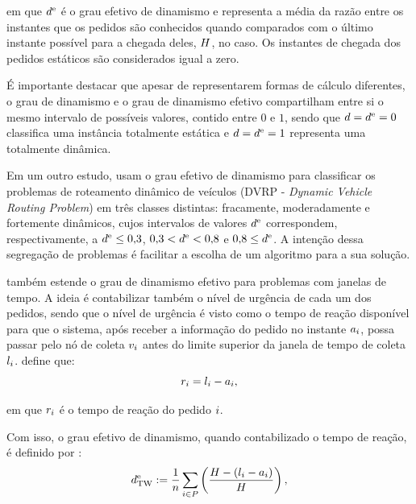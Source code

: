 \noindent em que $d^\text{e}$ é o grau efetivo de dinamismo e 
representa a média da razão entre os instantes que os pedidos são conhecidos 
quando comparados com o último instante possível para a chegada deles, 
$H$, no caso. Os instantes de chegada dos pedidos estáticos são 
considerados igual a zero.

É importante destacar que apesar de representarem formas de cálculo diferentes,
o grau de dinamismo e o grau de dinamismo efetivo compartilham entre si o mesmo
intervalo de possíveis valores, contido entre $0$ e $1$, sendo que
$d = d^\text{e} = 0$ classifica uma instância
totalmente estática e $d = d^\text{e} = 1$ representa
uma totalmente dinâmica.

Em um outro estudo,  usam o grau efetivo
de dinamismo para classificar os problemas de roteamento dinâmico de veículos
(DVRP - \textit{Dynamic Vehicle Routing Problem}) em três classes distintas:
fracamente, moderadamente e fortemente dinâmicos, cujos intervalos de valores 
$d^\text{e}$ correspondem, respectivamente, a $d^\text{e} \leq
0{,}3$, $0{,}3  < d^\text{e} < 0{,}8$ e $0{,}8 \leq
d^\text{e}$.
A intenção dessa segregação de problemas é facilitar a escolha de um algoritmo
para a sua solução.

 também estende o grau de dinamismo efetivo
para problemas com janelas de tempo.
A ideia é contabilizar também o nível de urgência de cada um dos pedidos, 
sendo que o nível de urgência é visto como o tempo de reação disponível
para que o sistema, após receber a informação do pedido no instante
$a_i$, possa passar pelo nó de coleta $v_{i}$
antes do limite superior da janela de tempo de coleta
$l_{i}$.
 define que: 
%
\begin{equation}
  r_i = l_{i}
                           - a_i,
\end{equation}

\noindent em que $r_i$ é o tempo de reação do pedido
$i$.

Com isso, o grau efetivo de dinamismo, quando contabilizado o tempo de reação,
é definido por \cite{larsen_dynamic_2000}:
%
%
\begin{equation}
  d^\text{e}_\text{TW} := 
  \frac{1}{n}
  \sum_{i \in P}
  {
    \left(
    \frac{H - (l_i
                             - a_i)}
         {H}
    \right),
  }
\end{equation}

